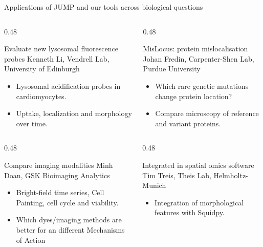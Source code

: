\documentclass[aspectratio=169,10pt]{beamer}
\begin{document}
\begin{frame}[label={sec:org0000013}]{Applications of JUMP and our tools across biological questions}
\begin{columns}[T,onlytextwidth]
\begin{column}{0.48\textwidth}
\begin{block}{Evaluate new lysosomal fluorescence probes}
\small Kenneth Li, Vendrell Lab, University of Edinburgh\par
\begin{itemize}
\item Lysosomal acidification probes in cardiomyocytes.
\item Uptake, localization and morphology over time.
\end{itemize}
\end{block}
\end{column}
\begin{column}{0.48\textwidth}
\begin{block}{MisLocus: protein mislocalisation}
\small Johan Fredin, Carpenter-Shen Lab, Purdue University\par
\begin{itemize}
\item Which rare genetic mutations change protein location?
\item Compare microscopy of reference and variant proteins.
\end{itemize}
\end{block}
\end{column}
\end{columns}
\begin{columns}[T,onlytextwidth]
\begin{column}{0.48\textwidth}
\begin{block}{Compare imaging modalities}
\small Minh Doan, GSK Bioimaging Analytics\par
\begin{itemize}
\item Bright-field time series, Cell Painting, cell cycle and viability.
\item Which dyes/imaging methods are better for an different Mechanisms of Action
\end{itemize}
\end{block}
\end{column}
\begin{column}{0.48\textwidth}
\begin{block}{Integrated in spatial omics software}
\small Tim Treis, Theis Lab, Helmholtz-Munich\par
\begin{itemize}
\item Integration of morphological features with Squidpy.
\end{itemize}
\end{block}
\end{column}
\end{columns}
\end{frame}
\end{document}
